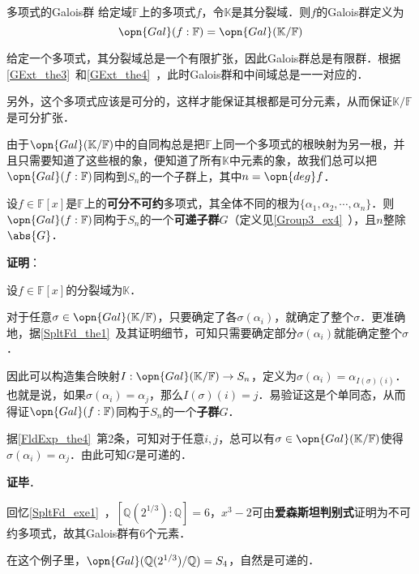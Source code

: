 \begin{definition}{多项式的Galois群}
给定域$\mathbb{F}$上的多项式$f$，令$\mathbb{K}$是其分裂域．则$f$的Galois群定义为
\begin{equation}
\opn{Gal}(f:\mathbb{F})=\opn{Gal}(\mathbb{K}/\mathbb{F})
\end{equation}
\end{definition}

给定一个多项式，其分裂域总是一个有限扩张，因此Galois群总是有限群．根据\autoref{GExt_the3}~和\autoref{GExt_the4}~，此时Galois群和中间域总是一一对应的．

另外，这个多项式应该是可分的，这样才能保证其根都是可分元素，从而保证$\mathbb{K}/\mathbb{F}$是可分扩张．

由于$\opn{Gal}(\mathbb{K}/\mathbb{F})$中的自同构总是把$\mathbb{F}$上同一个多项式的根映射为另一根，并且只需要知道了这些根的象，便知道了所有$\mathbb{K}$中元素的象，故我们总可以把$\opn{Gal}(f:\mathbb{F})$同构到$S_n$的一个子群上，其中$n=\opn{deg}f$．

\begin{theorem}{}\label{PlyRtS_the1}
设$f\in\mathbb{F}[x]$是$\mathbb{F}$上的\textbf{可分不可约}多项式，其全体不同的根为$\{\alpha_1, \alpha_2, \cdots, \alpha_n\}$．则$\opn{Gal}(f:\mathbb{F})$同构于$S_n$的一个\textbf{可递子群}$G$（定义见\autoref{Group3_ex4}~），且$n$整除$\abs{G}$．
\end{theorem}

\textbf{证明}：

设$f\in\mathbb{F}[x]$的分裂域为$\mathbb{K}$．

对于任意$\sigma\in\opn{Gal}(\mathbb{K}/\mathbb{F})$，只要确定了各$\sigma(\alpha_i)$，就确定了整个$\sigma$．更准确地，据\autoref{SpltFd_the1}~及其证明细节，可知只需要确定部分$\sigma(\alpha_i)$就能确定整个$\sigma$．

因此可以构造集合映射$I:\opn{Gal}(\mathbb{K}/\mathbb{F})\to S_n$，定义为$\sigma(\alpha_i)=\alpha_{I(\sigma)(i)}$．也就是说，如果$\sigma(\alpha_i)=\alpha_j$，那么$I(\sigma)(i)=j$．易验证这是个单同态，从而得证$\opn{Gal}(f:\mathbb{F})$同构于$S_n$的一个\textbf{子群}$G$．

据\autoref{FldExp_the4}~第2条，可知对于任意$i, j$，总可以有$\sigma\in\opn{Gal}(\mathbb{K}/\mathbb{F})$使得$\sigma(\alpha_i)=\alpha_j$．由此可知$G$是可递的．

\textbf{证毕}．


\begin{example}{}
回忆\autoref{SpltFd_exe1}~，$[\mathbb{Q}(2^{1/3}):\mathbb{Q}]=6$，$x^3-2$可由\textbf{爱森斯坦判别式}证明为不可约多项式，故其Galois群有6个元素．

在这个例子里，$\opn{Gal}(\mathbb{Q}(2^{1/3})/\mathbb{Q})=S_4$，自然是可递的．
\end{example}

